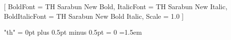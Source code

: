 
\usepackage{fontspec}
\usepackage{polyglossia}
\setmainlanguage{thai}
\setmainfont{TH Sarabun New}[
  BoldFont       = {TH Sarabun New Bold},
  ItalicFont     = {TH Sarabun New Italic},
  BoldItalicFont = {TH Sarabun New Bold Italic},
  Scale          = 1.0
]
\newfontfamily{}

\newcommand{\thaialph}[1]{%
  \ifcase#1%
  \or ก\or ข\or ค\or ง\or จ%
  \or ฉ\or ช\or ซ\or ฌ\or ญ%
  \or ฎ\or ฏ\or ฐ\or ฑ\or ฒ%
  \or ณ\or ด\or ต\or ถ\or ท%
  \or ธ\or น\or บ\or ป\or ผ%
  \or ฝ\or พ\or ฟ\or ภ\or ม%
  \else ?\fi%
}

\usepackage[
  a4paper,
  top        = 3.81cm,  %
  bottom     = 2.54cm,  %
  left       = 3.81cm,  %
  right      = 2.54cm,  %
  headheight = 18pt,    %
  headsep    = 1.27cm,  %
]{geometry}

\usepackage{setspace}
\usepackage{indentfirst}   %
\onehalfspacing
\setlength{\parindent}{1.27cm}
\setlength{\parskip}{0pt}
\XeTeXlinebreaklocale "th"
\XeTeXlinebreakskip = 0pt plus 0.5pt minus 0.5pt
\XeTeXlinebreakpenalty = 0
\emergencystretch=1.5em

\usepackage{fancyhdr}
\pagestyle{fancy}
\fancyhf{}
\fancyhead[R]{\fontsize{14}{16}\selectfont\thepage}  %
\renewcommand{\headrulewidth}{0pt}
\fancypagestyle{plain}{
  \fancyhf{}
  \renewcommand{\headrulewidth}{0pt}
}


